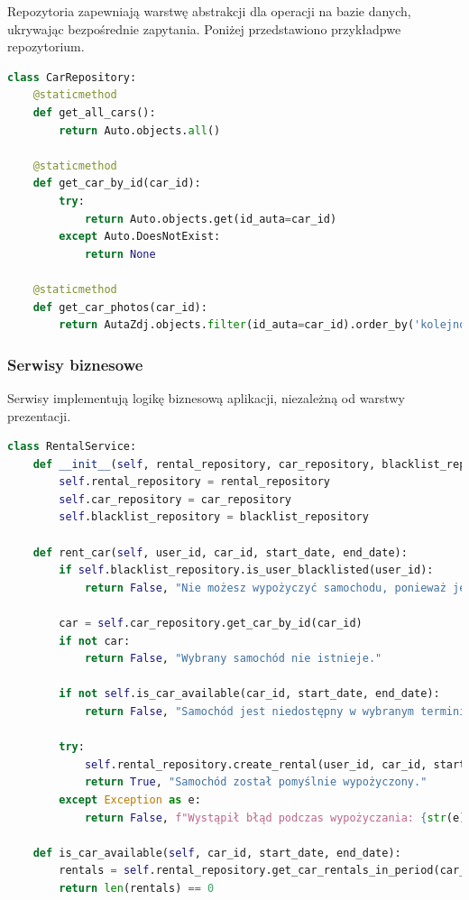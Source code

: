 \documentclass[12pt,a4paper]{article}
\begin{document}
Repozytoria zapewniają warstwę abstrakcji dla operacji na bazie danych, ukrywając bezpośrednie zapytania. Poniżej przedstawiono przykładpwe repozytorium.

\begin{lstlisting}[language=Python, caption={Fragment klasy CarRepository}]
class CarRepository:
    @staticmethod
    def get_all_cars():
        return Auto.objects.all()
    
    @staticmethod
    def get_car_by_id(car_id):
        try:
            return Auto.objects.get(id_auta=car_id)
        except Auto.DoesNotExist:
            return None
    
    @staticmethod
    def get_car_photos(car_id):
        return AutaZdj.objects.filter(id_auta=car_id).order_by('kolejnosc')
\end{lstlisting}

\newpage

\subsubsection{Serwisy biznesowe}

Serwisy implementują logikę biznesową aplikacji, niezależną od warstwy prezentacji.

\begin{lstlisting}[language=Python, caption={Fragment klasy RentalService}]
class RentalService:
    def __init__(self, rental_repository, car_repository, blacklist_repository):
        self.rental_repository = rental_repository
        self.car_repository = car_repository
        self.blacklist_repository = blacklist_repository
    
    def rent_car(self, user_id, car_id, start_date, end_date):
        if self.blacklist_repository.is_user_blacklisted(user_id):
            return False, "Nie możesz wypożyczyć samochodu, ponieważ jesteś na czarnej liście."

        car = self.car_repository.get_car_by_id(car_id)
        if not car:
            return False, "Wybrany samochód nie istnieje."

        if not self.is_car_available(car_id, start_date, end_date):
            return False, "Samochód jest niedostępny w wybranym terminie."
            
        try:
            self.rental_repository.create_rental(user_id, car_id, start_date, end_date)
            return True, "Samochód został pomyślnie wypożyczony."
        except Exception as e:
            return False, f"Wystąpił błąd podczas wypożyczania: {str(e)}"
    
    def is_car_available(self, car_id, start_date, end_date):
        rentals = self.rental_repository.get_car_rentals_in_period(car_id, start_date, end_date)
        return len(rentals) == 0
\end{lstlisting}
\end{document}
